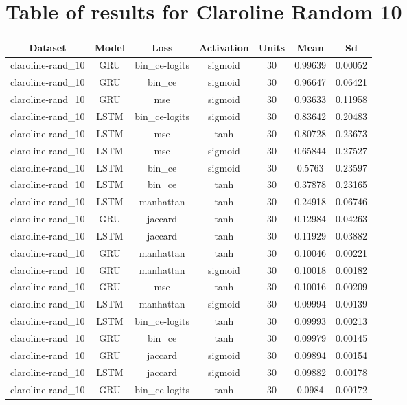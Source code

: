 \documentclass{article}%
\begin{document}
%
\newpage%
\section{Table of results for Claroline Random 10}%
\label{sec:TableofresultsforClarolineRandom10}%
\begin{longtable}{|c|c|c|c|c|c|c|}%
\hline%
\rowcolor{lightgray!70}%
\textbf{Dataset}&\textbf{Model}&\textbf{Loss}&\textbf{Activation}&\textbf{Units}&\textbf{Mean}&\textbf{Sd}\\%
\hline%
claroline{-}rand\_10&GRU&bin\_ce{-}logits&sigmoid&30&0.99639&0.00052\\%
\hline%
claroline{-}rand\_10&GRU&bin\_ce&sigmoid&30&0.96647&0.06421\\%
\hline%
claroline{-}rand\_10&GRU&mse&sigmoid&30&0.93633&0.11958\\%
\hline%
claroline{-}rand\_10&LSTM&bin\_ce{-}logits&sigmoid&30&0.83642&0.20483\\%
\hline%
claroline{-}rand\_10&LSTM&mse&tanh&30&0.80728&0.23673\\%
\hline%
claroline{-}rand\_10&LSTM&mse&sigmoid&30&0.65844&0.27527\\%
\hline%
claroline{-}rand\_10&LSTM&bin\_ce&sigmoid&30&0.5763&0.23597\\%
\hline%
claroline{-}rand\_10&LSTM&bin\_ce&tanh&30&0.37878&0.23165\\%
\hline%
claroline{-}rand\_10&LSTM&manhattan&tanh&30&0.24918&0.06746\\%
\hline%
claroline{-}rand\_10&GRU&jaccard&tanh&30&0.12984&0.04263\\%
\hline%
claroline{-}rand\_10&LSTM&jaccard&tanh&30&0.11929&0.03882\\%
\hline%
claroline{-}rand\_10&GRU&manhattan&tanh&30&0.10046&0.00221\\%
\hline%
claroline{-}rand\_10&GRU&manhattan&sigmoid&30&0.10018&0.00182\\%
\hline%
claroline{-}rand\_10&GRU&mse&tanh&30&0.10016&0.00209\\%
\hline%
claroline{-}rand\_10&LSTM&manhattan&sigmoid&30&0.09994&0.00139\\%
\hline%
claroline{-}rand\_10&LSTM&bin\_ce{-}logits&tanh&30&0.09993&0.00213\\%
\hline%
claroline{-}rand\_10&GRU&bin\_ce&tanh&30&0.09979&0.00145\\%
\hline%
claroline{-}rand\_10&GRU&jaccard&sigmoid&30&0.09894&0.00154\\%
\hline%
claroline{-}rand\_10&LSTM&jaccard&sigmoid&30&0.09882&0.00178\\%
\hline%
claroline{-}rand\_10&GRU&bin\_ce{-}logits&tanh&30&0.0984&0.00172\\%
\hline%
\end{longtable}
\end{document}
